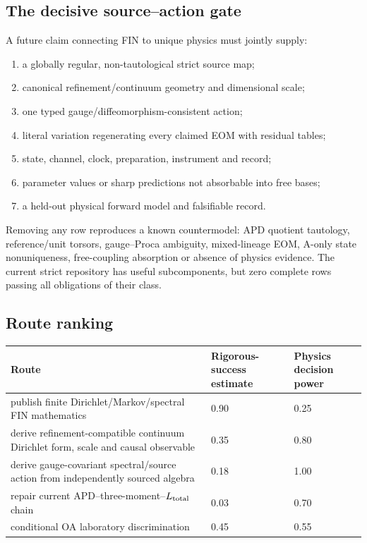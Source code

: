 \documentclass[11pt,a4paper]{article}
\begin{document}
\subsection{The decisive source--action gate}

A future claim connecting FIN to unique physics must jointly supply:
\begin{enumerate}[label=G\arabic*.]
\item a globally regular, non-tautological strict source map;
\item canonical refinement/continuum geometry and dimensional scale;
\item one typed gauge/diffeomorphism-consistent action;
\item literal variation regenerating every claimed EOM with residual tables;
\item state, channel, clock, preparation, instrument and record;
\item parameter values or sharp predictions not absorbable into free bases;
\item a held-out physical forward model and falsifiable record.
\end{enumerate}

Removing any row reproduces a known countermodel: APD quotient tautology,
reference/unit torsors, gauge--Proca ambiguity, mixed-lineage EOM, A-only state
nonuniqueness, free-coupling absorption or absence of physics evidence.  The
current strict repository has useful subcomponents, but zero complete rows
passing all obligations of their class.

\subsection{Route ranking}

\begin{longtable}{@{}p{}p{}p{}@{}}
\toprule
Route & Rigorous-success estimate & Physics decision power \\
\midrule\endhead
publish finite Dirichlet/Markov/spectral FIN mathematics & 0.90 & 0.25 \\
derive refinement-compatible continuum Dirichlet form, scale and causal observable & 0.35 & 0.80 \\
derive gauge-covariant spectral/source action from independently sourced algebra & 0.18 & 1.00 \\
repair current APD--three-moment--$L_{\rm total}$ chain & 0.03 & 0.70 \\
conditional OA laboratory discrimination & 0.45 & 0.55 \\
\bottomrule
\end{longtable}
\end{document}
